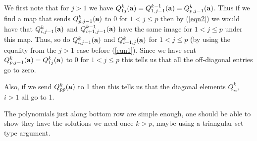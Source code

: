 \documentclass[11pt]{amsart}
\begin{document}
\noindent We first note that for $j>1$ we have $Q_{1j}^k({\bf a}) = Q_{1,j-1}^{k-1}({\bf a}) = Q_{p,j-1}^k({\bf a})$. Thus if we find a map that sends $Q_{p,j-1}^k({\bf a})$ to 0 for $1<j\le p$ then by (\ref{eqn2}) we would have that $Q_{i,j-1}^k({\bf a})$ and $Q_{i+1,j-1}^{k-1}({\bf a})$ have the same image for $1<j\le p$ under this map. Thus, so do $Q_{i,j-1}^k({\bf a})$ and $Q_{i+1,j}^k({\bf a})$ for $1<j\le p$ (by using the equality from the $j>1$ case before (\ref{eqn1}). Since we have sent $Q_{p,j-1}^k({\bf a}) = Q_{1j}^k({\bf a})$ to 0 for $1<j\le p$ this tells us that all the off-diagonal entries go to zero.

Also, if we send $Q_{pp}^k({\bf a})$ to 1 then this tells us that the diagonal elements $Q_{ii}^k$, $i>1$ all go to 1.

The polynomials just along bottom row are simple enough, one should be able to show they have the solutions we need once $k>p$, maybe using a triangular set type argument.
\end{document}
